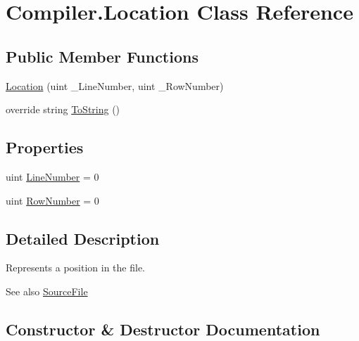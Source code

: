 \hypertarget{class_compiler_1_1_location}{}\section{Compiler.\+Location Class Reference}
\label{class_compiler_1_1_location}
\subsection*{Public Member Functions}
\begin{DoxyCompactItemize}
\item 
\mbox{\hyperlink{class_compiler_1_1_location_a389e64f3314c314948b740af8de9dcea}{Location}} (uint \+\_\+\+Line\+Number, uint \+\_\+\+Row\+Number)
\item 
override string \mbox{\hyperlink{class_compiler_1_1_location_a44ca3fe0ddbc48974f1f85fc6df0ba90}{To\+String}} ()
\end{DoxyCompactItemize}
\subsection*{Properties}
\begin{DoxyCompactItemize}
\item 
uint \mbox{\hyperlink{class_compiler_1_1_location_a71feb3bfd70af6096dc48451765ba284}{Line\+Number}} = 0
\item 
uint \mbox{\hyperlink{class_compiler_1_1_location_a766213e18168dcb22d657bee4f047ed9}{Row\+Number}} = 0
\end{DoxyCompactItemize}


\subsection{Detailed Description}
Represents a position in the file. \begin{DoxySeeAlso}{See also}
\mbox{\hyperlink{class_compiler_1_1_source_file}{Source\+File}} 
\end{DoxySeeAlso}


\subsection{Constructor \& Destructor Documentation}
\mbox{\label{class_compiler_1_1_location_a389e64f3314c314948b740af8de9dcea}} 
